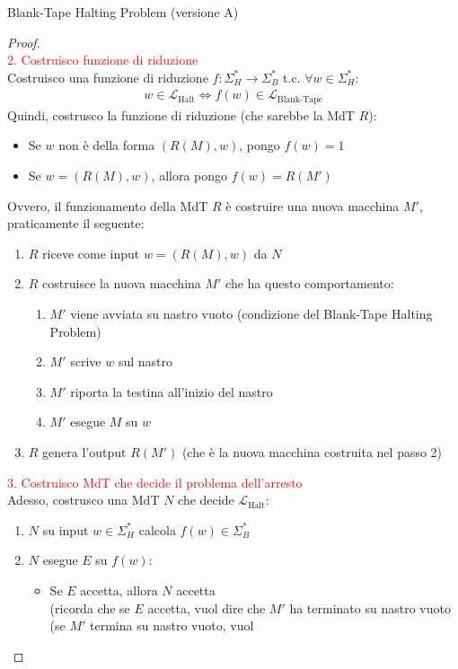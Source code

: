 \documentclass{article}  %
\theoremstyle{definition}
\begin{document}
\begin{theorem}{Blank-Tape Halting Problem (versione A)}
\begin{proof}
\[		\]
		\textcolor{red}{2. Costruisco funzione di riduzione} \\
		Costruisco una funzione di riduzione $f: \Sigma_H^* \rightarrow \Sigma_B^*$ t.c. $\forall{w} \in \Sigma_H^*$:
		\begin{align*}
			w \in \mathcal{L}_{\text{Halt}} \iff f(w) \in \mathcal{L}_{\text{Blank-Tape}}
		\end{align*}
		Quindi, costrusco la funzione di riduzione (che sarebbe la MdT $R$):
		\begin{itemize}
			\item Se $w$ non è della forma $(R(M),w)$, pongo $f(w)=1$
			\item Se $w=(R(M),w)$, allora pongo $f(w)=R(M')$
		\end{itemize}
		Ovvero, il funzionamento della MdT $R$ è costruire una nuova macchina $M'$, praticamente il seguente:
		\begin{enumerate}
			\item $R$ riceve come input $w=(R(M),w)$ da $N$
			\item $R$ costruisce la nuova macchina $M'$ che ha questo comportamento:
			      \begin{enumerate}
				      \item $M'$ viene avviata su nastro vuoto (condizione del Blank-Tape Halting Problem)
				      \item $M'$ scrive $w$ sul nastro
				      \item $M'$ riporta la testina all'inizio del nastro
				      \item $M'$ esegue $M$ su $w$
			      \end{enumerate}
			\item $R$ genera l'output $R(M')$ (che è la nuova macchina costruita nel passo 2)
		\end{enumerate}
		\textcolor{red}{3. Costruisco MdT che decide il problema dell'arresto} \\
		Adesso, costrusco una MdT $N$ che decide $\mathcal{L}_{\text{Halt}}$:
		\begin{enumerate}
			\item $N$ su input $w \in \Sigma_H^*$ calcola $f(w) \in \Sigma_B^*$
			\item $N$ esegue $E$ su $f(w)$:
			      \begin{itemize}
				      \item Se $E$ accetta, allora $N$ accetta \\
				            (ricorda che se $E$ accetta, vuol dire che $M'$ ha terminato su nastro vuoto (se $M'$ termina su nastro vuoto, vuol

\end{itemize}
\end{enumerate}
\end{proof}
\end{theorem}
\end{document}
